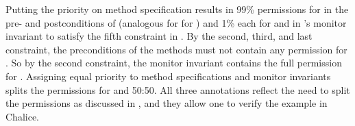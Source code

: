 \documentclass{llncs}
\begin{document}
Putting the priority on method specification results in 99\%
permissions for  in the pre- and postconditions of
 (analogous for  for
) and 1\% each for  and 
in 's monitor invariant to satisfy the fifth constraint
in . By the second, third, and
last constraint, the
preconditions of the  methods must not contain any
permission for . So by the second constraint, the
monitor invariant contains the full permission for .
Assigning equal priority to method specifications and monitor
invariants splits the permissions for  and
 50:50.  All three annotations reflect the need to split
the permissions as discussed in , and they
allow one to verify the example in Chalice.






%
\end{document}
